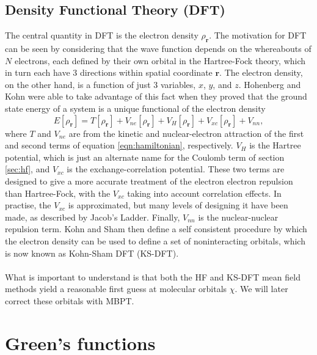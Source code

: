 \documentclass[12pt]{caltech_thesis}
\begin{document}
\subsection{Density Functional Theory (DFT)}
The central quantity in DFT is the electron density $\rho_\textbf{r} $. The motivation for DFT can be seen by considering that the wave function depends on the whereabouts of $N$ electrons, each defined by their own orbital in the Hartree-Fock theory, which in turn each have 3 directions within spatial coordinate $\textbf{r}$. The electron density, on the other hand, is a function of just 3 variables, $x$, $y$, and $z$. Hohenberg and Kohn were able to take advantage of this fact when they proved that the ground state energy of a system is a unique functional of the electron density \autocite{Hohenberg1964}
\begin{equation}
    E[\rho_\textbf{r} ] = T[\rho_\textbf{r} ] + V_{ne}[\rho_\textbf{r} ] + V_H[\rho_\textbf{r} ] + V_{xc}[\rho_\textbf{r} ] + V_{nn},
\end{equation}
where $T$ and $V_{ne}$ are from the kinetic and nuclear-electron attraction of the first and second terms of equation \ref{eqn:hamiltonian}, respectively. $V_H$ is the Hartree potential, which is just an alternate name for the Coulomb term of section \ref{sec:hf}, and $V_{xc}$ is the exchange-correlation potential. These two terms are designed to give a more accurate treatment of the electron electron repulsion than Hartree-Fock, with the $V_{xc}$ taking into account correlation effects.
 In practise, the $V_{xc}$ is approximated, but many levels of designing it have been made, as described by Jacob's Ladder. \autocite{milman_jacobs_2021} Finally, $V_{nn}$ is the nuclear-nuclear repulsion term. Kohn and Sham then define a self consistent procedure by which the electron density can be used to define a set of noninteracting orbitals, which is now known as Kohn-Sham DFT (KS-DFT).\autocite{PhysRev.140.A1133}
\\\\ What is important to understand is that both the HF and KS-DFT mean field methods yield a reasonable first guess \autocite{bruneval_gw_2021} at molecular orbitals $\chi$. We will later correct these orbitals with MBPT.
\section{Green's functions}
\end{document}

